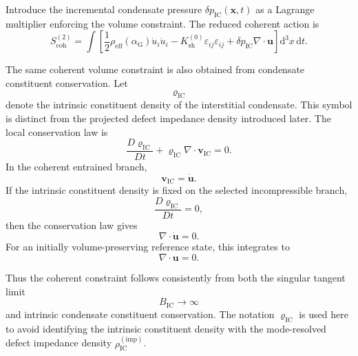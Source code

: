 Introduce the incremental condensate pressure $\delta p_{\mathrm{IC}}(\mathbf{x},t)$ as a Lagrange multiplier enforcing the volume constraint. The reduced coherent action is
\begin{equation}
    S_{\mathrm{coh}}^{(2)} = \int \left[ \frac{1}{2} \rho_{\mathrm{eff}}(\alpha_{\mathrm{G}}) \dot{u}_i\dot{u}_i - K_{\mathrm{sh}}^{(0)} \varepsilon_{ij}\varepsilon_{ij} + \delta p_{\mathrm{IC}} \nabla\cdot\mathbf{u} \right] \mathrm{d}^3x \, \mathrm{d}t.
\end{equation}

The same coherent volume constraint is also obtained from condensate constituent conservation. Let
\begin{equation}
    \varrho_{\mathrm{IC}}
\end{equation}
denote the intrinsic constituent density of the interstitial condensate. This symbol is distinct from the projected defect impedance density introduced later. The local conservation law is
\begin{equation}
    \frac{D\varrho_{\mathrm{IC}}}{Dt}
    +
    \varrho_{\mathrm{IC}}
    \nabla\cdot\mathbf v_{\mathrm{IC}}
    =
    0.
\end{equation}
In the coherent entrained branch,
\begin{equation}
    \mathbf v_{\mathrm{IC}}
    =
    \dot{\mathbf u}.
\end{equation}
If the intrinsic constituent density is fixed on the selected incompressible branch,
\begin{equation}
    \frac{D\varrho_{\mathrm{IC}}}{Dt}
    =
    0,
\end{equation}
then the conservation law gives
\begin{equation}
    \nabla\cdot\dot{\mathbf u}
    =
    0.
\end{equation}
For an initially volume-preserving reference state, this integrates to
\begin{equation}
    \nabla\cdot\mathbf u
    =
    0.
\end{equation}

Thus the coherent constraint follows consistently from both the singular tangent limit
\begin{equation}
    B_{\mathrm{IC}}\rightarrow\infty
\end{equation}
and intrinsic condensate constituent conservation. The notation \(\varrho_{\mathrm{IC}}\) is used here to avoid identifying the intrinsic constituent density with the mode-resolved defect impedance density \(\rho_{\mathrm{IC}}^{(\mathrm{imp})}\).

